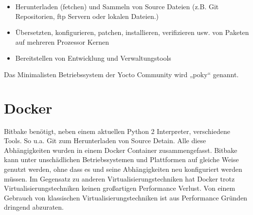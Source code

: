 \begin{itemize}
    \item Herunterladen (fetchen) und Sammeln von Source Dateien
        (z.B. Git Repositorien, ftp Servern oder lokalen Dateien.)
    \item Übersetzten, konfigurieren, patchen, installieren, verifizieren usw.
        von Paketen auf mehreren Prozessor Kernen
    \item Bereitstellen von Entwicklung und Verwaltungstools
\end{itemize}

Das Minimalisten Betriebssystem der Yocto Community wird „poky“ genannt.


\section{Docker} \label{sec:docker}
Bitbake benötigt, neben einem aktuellen Python 2 Interpreter, verschiedene
Tools. So u.a. Git zum Herunterladen von Source Detain. Alle diese
Abhängigkeiten wurden in einem \gls{Docker} Container zusammengefasst.  Bitbake kann
unter unschädlichen Betriebssystemen und Plattformen auf gleiche Weise genutzt
werden, ohne dass es und seine Abhängigkeiten neu konfiguriert werden müssen.
Im Gegensatz zu anderen Virtualisierungstechniken hat Docker trotz
Virtualisierungstechniken keinen großartigen Performance Verlust.
Von einem Gebrauch von klassischen Virtualisierungstechniken ist aus
Performance Gründen dringend abzuraten.



